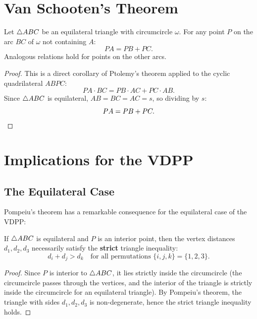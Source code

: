 \section{Van Schooten's Theorem}
\label{sec:van-schooten}

\begin{theorem}
\label{thm:van-schooten}
Let $\triangle ABC$ be an equilateral triangle with circumcircle $\omega$. For any point $P$ on the arc $BC$ of $\omega$ not containing $A$:
\begin{equation}
PA = PB + PC.
\end{equation}
Analogous relations hold for points on the other arcs.
\end{theorem}

\begin{proof}
This is a direct corollary of Ptolemy's theorem applied to the cyclic quadrilateral $ABPC$:
\begin{equation}
PA \cdot BC = PB \cdot AC + PC \cdot AB.
\end{equation}
Since $\triangle ABC$ is equilateral, $AB = BC = AC = s$, so dividing by $s$:
\begin{equation}
PA = PB + PC. \qedhere
\end{equation}
\end{proof}

\section{Implications for the VDPP}

\subsection{The Equilateral Case}

Pompeiu's theorem has a remarkable consequence for the equilateral case of the VDPP:

\begin{corollary}
\label{cor:pompeiu-feasibility}
If $\triangle ABC$ is equilateral and $P$ is an interior point, then the vertex distances $d_1, d_2, d_3$ necessarily satisfy the \textbf{strict} triangle inequality:
\begin{equation}
d_i + d_j > d_k \quad \text{for all permutations } \{i, j, k\} = \{1, 2, 3\}.
\end{equation}
\end{corollary}

\begin{proof}
Since $P$ is interior to $\triangle ABC$, it lies strictly inside the circumcircle (the circumcircle passes through the vertices, and the interior of the triangle is strictly inside the circumcircle for an equilateral triangle). By Pompeiu's theorem, the triangle with sides $d_1, d_2, d_3$ is non-degenerate, hence the strict triangle inequality holds.
\end{proof}

